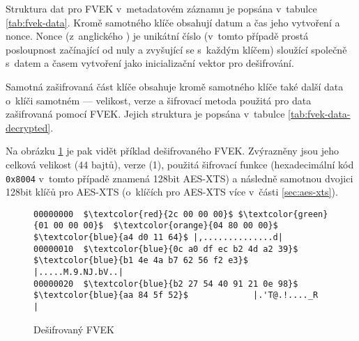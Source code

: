 
Struktura dat pro FVEK v~metadatovém záznamu je popsána v~tabulce \ref{tab:fvek-data}. Kromě samotného klíče obsahují datum a čas jeho vytvoření a nonce.\cite{Metz2011,Kornblum2009} Nonce (z~anglického ) je unikátní číslo (v~tomto případě prostá posloupnost začínající od nuly a zvyšující se s~každým klíčem) sloužící společně s~datem a časem vytvoření jako inicializační vektor pro dešifrování\cite{Kohnoc2010}.

Samotná zašifrovaná část klíče obsahuje kromě samotného klíče také další data o~klíči samotném --- velikost, verze a šifrovací metoda použitá pro data zašifrovaná pomocí FVEK. Jejich struktura je popsána v~tabulce \ref{tab:fvek-data-decrypted}.\cite{Metz2011,Kornblum2009}


Na obrázku \ref{fig:fvek-decrypted} je pak vidět příklad dešifrovaného FVEK. Zvýrazněny jsou jeho celková velikost (44 bajtů), verze (1), použitá šifrovací funkce (hexadecimální kód \texttt{0x8004} v~tomto případě znamená 128bit AES-XTS) a následně samotnou dvojici 128bit klíčů pro AES-XTS (o~klíčích pro AES-XTS více v~části \ref{sec:aes-xts}).

\begin{figure}[h]
		\centering
		\captionsetup{width=0.65\linewidth}
\begin{lstlisting}[frame=none, escapechar=$, basicstyle=\ttfamily\small, columns=fullflexible, keepspaces=true]
00000000  $\textcolor{red}{2c 00 00 00}$ $\textcolor{green}{01 00 00 00}$  $\textcolor{orange}{04 80 00 00}$ $\textcolor{blue}{a4 d0 11 64}$ |,..............d|
00000010  $\textcolor{blue}{0c a0 df ec b2 4d a2 39}$  $\textcolor{blue}{b1 4e 4a b7 62 56 f2 e3}$ |.....M.9.NJ.bV..|
00000020  $\textcolor{blue}{b2 27 54 40 91 21 0e 98}$  $\textcolor{blue}{aa 84 5f 52}$             |.'T@.!...._R    |
\end{lstlisting}
		\caption{Dešifrovaný FVEK}
		\label{fig:fvek-decrypted}
\end{figure}

